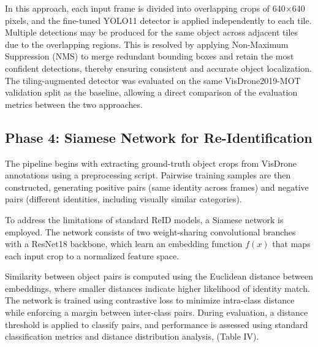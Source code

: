\documentclass[conference]{IEEEtran}
\begin{document}
In this approach, each input frame is divided into overlapping crops of 640×640 pixels, and the fine-tuned YOLO11 detector is applied independently to each tile. Multiple detections may be produced for the same object across adjacent tiles due to the overlapping regions. This is resolved by applying Non-Maximum Suppression (NMS) to merge redundant bounding boxes and retain the most confident detections, thereby ensuring consistent and accurate object localization.
The tiling-augmented detector was evaluated on the same VisDrone2019-MOT validation split as the baseline, allowing a direct comparison of the evaluation metrics between the two approaches.

\subsection{Phase 4: Siamese Network for Re-Identification}
The pipeline begins with extracting ground-truth object crops from VisDrone annotations using a preprocessing script. Pairwise training samples are then constructed, generating positive pairs (same identity across frames) and negative pairs (different identities, including visually similar categories).

To address the limitations of standard ReID models, a Siamese network is employed. The network consists of two weight-sharing convolutional branches with a ResNet18 backbone, which learn an embedding function \( f(x) \) that maps each input crop to a normalized feature space.

Similarity between object pairs is computed using the Euclidean distance between embeddings, where smaller distances indicate higher likelihood of identity match. The network is trained using contrastive loss to minimize intra-class distance while enforcing a margin between inter-class pairs. During evaluation, a distance threshold is applied to classify pairs, and performance is assessed using standard classification metrics and distance distribution analysis, (Table IV).
\end{document}
